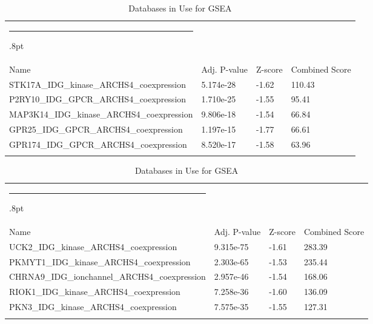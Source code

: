 \documentclass[3p,authoryear,preprint,12pt]{elsarticle}
\makeatletter
\def\hlinewd#1{%
  \noalign{\ifnum0=`}\fi\hrule \@height #1%
  \futurelet\reserved@a\@xhline}
\def\tbltoprule{\hlinewd{.8pt}\\[-12pt]}
\def\tblbottomrule{\noalign{\vspace*{6pt}}\hline\noalign{\vspace*{2pt}}}
\def\tblmidrule{\noalign{\vspace*{6pt}}\hline\noalign{\vspace*{2pt}}}
\makeatother
\begin{document}
\begin{table}[!htbp]
	\caption{{Databases in Use for GSEA} }
	\label{tw-de478ae31cc6}
	\def\arraystretch{1}
	\ignorespaces 
	\centering 
	\begin{tabulary}{\linewidth}{p{\dimexpr.65\tabcolsep}p{\dimexpr.15\tabcolsep}p{\dimexpr.1\tabcolsep}p{\dimexpr.1\tabcolsep}}
		\tbltoprule Name & Adj. P-value & Z-score & Combined Score\\
		\tblmidrule
STK17A\_IDG\_kinase\_ARCHS4\_coexpression & 5.174e-28 & -1.62 & 110.43 \\
P2RY10\_IDG\_GPCR\_ARCHS4\_coexpression & 1.710e-25 & -1.55 & 95.41 \\
MAP3K14\_IDG\_kinase\_ARCHS4\_coexpression & 9.806e-18 & -1.54 & 66.84 \\
GPR25\_IDG\_GPCR\_ARCHS4\_coexpression & 1.197e-15 & -1.77 & 66.61 \\
GPR174\_IDG\_GPCR\_ARCHS4\_coexpression & 8.520e-17 & -1.58 & 63.96 \\
		\tblbottomrule
	\end{tabulary}\par 
\end{table}
\begin{table}[!htbp]
	\caption{{Databases in Use for GSEA} }
	\label{tw-de478ae31cc6}
	\def\arraystretch{1}
	\ignorespaces 
	\centering 
	\begin{tabulary}{\linewidth}{p{\dimexpr.65\tabcolsep}p{\dimexpr.15\tabcolsep}p{\dimexpr.1\tabcolsep}p{\dimexpr.1\tabcolsep}}
		\tbltoprule Name & Adj. P-value & Z-score & Combined Score\\
		\tblmidrule
UCK2\_IDG\_kinase\_ARCHS4\_coexpression & 9.315e-75 & -1.61 & 283.39 \\
PKMYT1\_IDG\_kinase\_ARCHS4\_coexpression & 2.303e-65 & -1.53 & 235.44 \\
CHRNA9\_IDG\_ionchannel\_ARCHS4\_coexpression & 2.957e-46 & -1.54 & 168.06 \\
RIOK1\_IDG\_kinase\_ARCHS4\_coexpression & 7.258e-36 & -1.60 & 136.09 \\
PKN3\_IDG\_kinase\_ARCHS4\_coexpression & 7.575e-35 & -1.55 & 127.31 \\
		\tblbottomrule
	\end{tabulary}\par 
\end{table}
\end{document}
